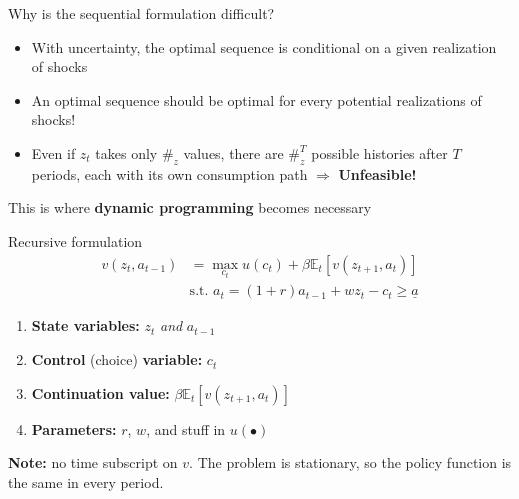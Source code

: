 \documentclass[
  10pt,
  ignorenonframetext,
  aspectratio=43,
  english,
]{beamer}
\providecommand{\tightlist}{%
  \setlength{\itemsep}{0pt}\setlength{\parskip}{0pt}}
\begin{document}
\begin{frame}{Why is the sequential formulation difficult?}
\protect{}\label{why-is-the-sequential-formulation-difficult}
\begin{itemize}
\tightlist
\item
  With uncertainty, the optimal sequence is conditional on a given
  realization of shocks
\item
  An optimal sequence should be optimal for every potential realizations
  of shocks!
\item
  Even if \(z_t\) takes only \(\#_{z}\) values, there are \(\#_{z}^{T}\)
  possible histories after \(T\) periods, each with its own consumption
  path \(\Rightarrow\) \textbf{Unfeasible!}
\end{itemize}

This is where \textbf{dynamic programming} becomes necessary
\end{frame}

\begin{frame}{Recursive formulation}
\protect{}\label{recursive-formulation}
\[
\begin{aligned}
v(z_{t},a_{t-1}) & =\max_{c_{t}}u(c_{t})+\beta\mathbb{E}_{t}\left[v(z_{t+1},a_{t})\right]\\
& \text{s.t. }a_{t}=(1+r)a_{t-1}+wz_{t}-c_{t}\geq\underline{a}
\end{aligned}
\]

\begin{enumerate}
\tightlist
\item
  \textbf{State variables:} \(z_{t}\) \emph{and} \(a_{t-1}\)
\item
  \textbf{Control} (choice) \textbf{variable:} \(c_{t}\)
\item
  \textbf{Continuation value:} \(\beta\mathbb{E}_{t}[v(z_{t+1},a_{t})]\)
\item
  \textbf{Parameters:} \(r\), \(w\), and stuff in \(u(\bullet)\)
\end{enumerate}

\textbf{Note:} no time subscript on \(v\). The problem is stationary, so
the policy function is the same in every period.
\end{frame}
\end{document}

